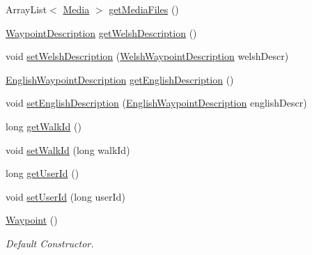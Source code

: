 \begin{DoxyCompactItemize}
Array\+List$<$ \hyperlink{classuk_1_1ac_1_1swan_1_1digitaltrails_1_1components_1_1_media}{Media} $>$ \hyperlink{classuk_1_1ac_1_1swan_1_1digitaltrails_1_1components_1_1_waypoint_a9765779371e8b0071c0f9fb5724a4fb6}{get\+Media\+Files} ()
\item 
\hyperlink{classuk_1_1ac_1_1swan_1_1digitaltrails_1_1components_1_1_waypoint_description}{Waypoint\+Description} \hyperlink{classuk_1_1ac_1_1swan_1_1digitaltrails_1_1components_1_1_waypoint_ad796bb44fce2cde1bacbb43464047419}{get\+Welsh\+Description} ()
\item 
void \hyperlink{classuk_1_1ac_1_1swan_1_1digitaltrails_1_1components_1_1_waypoint_a4afba29d4243bd1979a3ae6d0dd74c2e}{set\+Welsh\+Description} (\hyperlink{classuk_1_1ac_1_1swan_1_1digitaltrails_1_1components_1_1_welsh_waypoint_description}{Welsh\+Waypoint\+Description} welsh\+Descr)
\item 
\hyperlink{classuk_1_1ac_1_1swan_1_1digitaltrails_1_1components_1_1_english_waypoint_description}{English\+Waypoint\+Description} \hyperlink{classuk_1_1ac_1_1swan_1_1digitaltrails_1_1components_1_1_waypoint_a302266a14205eb24a5ef3d2e94ccd140}{get\+English\+Description} ()
\item 
void \hyperlink{classuk_1_1ac_1_1swan_1_1digitaltrails_1_1components_1_1_waypoint_a1d06c9915322c91ef4097ccfc66a41f5}{set\+English\+Description} (\hyperlink{classuk_1_1ac_1_1swan_1_1digitaltrails_1_1components_1_1_english_waypoint_description}{English\+Waypoint\+Description} english\+Descr)
\item 
long \hyperlink{classuk_1_1ac_1_1swan_1_1digitaltrails_1_1components_1_1_waypoint_ad1d089e43171c1e94aaa3dc56af715e3}{get\+Walk\+Id} ()
\item 
void \hyperlink{classuk_1_1ac_1_1swan_1_1digitaltrails_1_1components_1_1_waypoint_a5f67fc690c1d3bb8c2f90c3be1ebce96}{set\+Walk\+Id} (long walk\+Id)
\item 
long \hyperlink{classuk_1_1ac_1_1swan_1_1digitaltrails_1_1components_1_1_waypoint_a5f1a5b1d7815b99914a129481f26056d}{get\+User\+Id} ()
\item 
void \hyperlink{classuk_1_1ac_1_1swan_1_1digitaltrails_1_1components_1_1_waypoint_adbe2ca745c3a9fc3202b1f02017c7dc3}{set\+User\+Id} (long user\+Id)
\item 
\hyperlink{classuk_1_1ac_1_1swan_1_1digitaltrails_1_1components_1_1_waypoint_a80e9f795a05d55926e40172754d25345}{Waypoint} ()
\begin{DoxyCompactList}\small\item\em Default Constructor. \end{DoxyCompactList}\item 

\end{DoxyCompactItemize}
